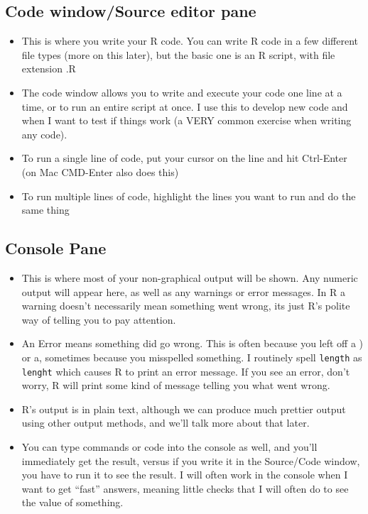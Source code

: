 \documentclass[
]{book}
\begin{document}
\hypertarget{code-windowsource-editor-pane}{%
\subsection{Code window/Source editor pane}\label{code-windowsource-editor-pane}}

\begin{itemize}
\item
  This is where you write your R code. You can write R code in a few different file types (more on this later), but the basic one is an R script, with file extension .R
\item
  The code window allows you to write and execute your code one line at a time, or to run an entire script at once. I use this to develop new code and when I want to test if things work (a VERY common exercise when writing any code).
\item
  To run a single line of code, put your cursor on the line and hit Ctrl-Enter (on Mac CMD-Enter also does this)
\item
  To run multiple lines of code, highlight the lines you want to run and do the same thing
\end{itemize}

\hypertarget{console-pane}{%
\subsection{Console Pane}\label{console-pane}}

\begin{itemize}
\item
  This is where most of your non-graphical output will be shown. Any numeric output will appear here, as well as any warnings or error messages. In R a warning doesn't necessarily mean something went wrong, its just R's polite way of telling you to pay attention.
\item
  An Error means something did go wrong. This is often because you left off a ) or a, sometimes because you misspelled something. I routinely spell \texttt{length} as \texttt{lenght} which causes R to print an error message. If you see an error, don't worry, R will print some kind of message telling you what went wrong.
\item
  R's output is in plain text, although we can produce much prettier output using other output methods, and we'll talk more about that later.
\item
  You can type commands or code into the console as well, and you'll immediately get the result, versus if you write it in the Source/Code window, you have to run it to see the result. I will often work in the console when I want to get ``fast'' answers, meaning little checks that I will often do to see the value of something.
\end{itemize}
\end{document}
